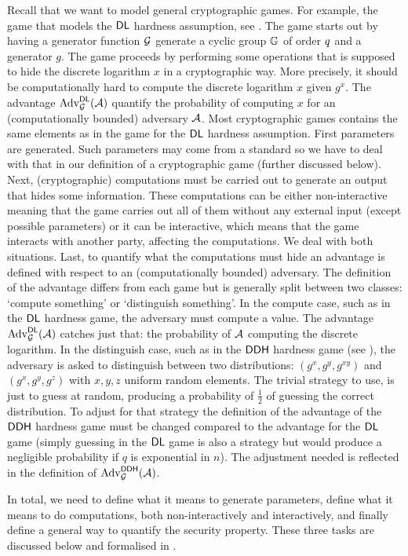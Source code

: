 Recall that we want to model general cryptographic games. For example, the game that models the $\mathsf{DL}$ hardness assumption, see . The game starts out by having a generator function $\operatorname{\mathcal{G}}$ generate a cyclic group $\mathbb{G}$ of order $q$ and a generator $g$. The game proceeds by performing some operations that is supposed to hide the discrete logarithm $x$ in a cryptographic way. More precisely, it should be computationally hard to compute the discrete logarithm $x$ given $g^x$. The advantage $\operatorname{Adv}_{\operatorname{\mathcal{G}}}^{\mathsf{DL}}(\mathcal{A})$ quantify the probability of computing $x$ for an (computationally bounded) adversary $\mathcal{A}$. Most cryptographic games contains the same elements as in the game for the $\mathsf{DL}$ hardness assumption. First parameters are generated. Such parameters may come from a standard so we have to deal with that in our definition of a cryptographic game (further discussed below). Next, (cryptographic) computations must be carried out to generate an output that hides some information. These computations can be either non-interactive meaning that the game carries out all of them without any external input (except possible parameters) or it can be interactive, which means that the game interacts with another party, affecting the computations. We deal with both situations. Last, to quantify what the computations must hide an advantage is defined with respect to an (computationally bounded) adversary. The definition of the advantage differs from each game but is generally split between two classes: `compute something' or `distinguish something'. In the compute case, such as in the $\mathsf{DL}$ hardness game, the adversary must compute a value. The advantage $\operatorname{Adv}_{\operatorname{\mathcal{G}}}^{\mathsf{DL}}(\mathcal{A})$ catches just that: the probability of $\mathcal{A}$ computing the discrete logarithm. In the distinguish case, such as in the $\mathsf{DDH}$ hardness game (see ), the adversary is asked to distinguish between two distributions: $(g^x,g^y,g^{xy})$ and $(g^x,g^y,g^z)$ with $x,y,z$ uniform random elements. The trivial strategy to use, is just to guess at random, producing a probability of $\frac{1}{2}$ of guessing the correct distribution. To adjust for that strategy the definition of the advantage of the $\mathsf{DDH}$ hardness game must be changed compared to the advantage for the $\mathsf{DL}$ game (simply guessing in the $\mathsf{DL}$ game is also a strategy but would produce a negligible probability if $q$ is exponential in $n$). The adjustment needed is reflected in the definition of $\operatorname{Adv}_{\operatorname{\mathcal{G}}}^{\mathsf{DDH}}(\mathcal{A})$. 

In total, we need to define what it means to generate parameters, define what it means to do computations, both non-interactively and interactively, and finally define a general way to quantify the security property. These three tasks are discussed below and formalised in .

